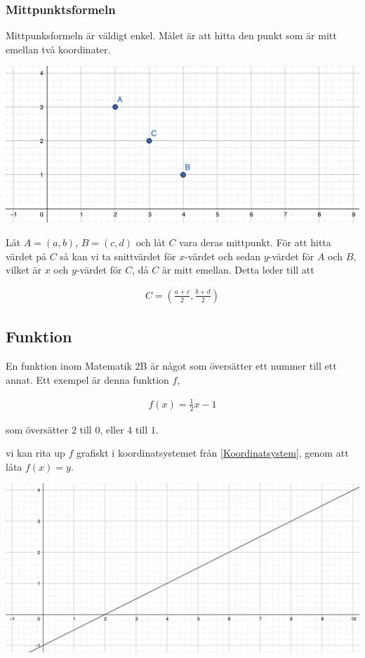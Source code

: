 \newpage
\subsubsection{Mittpunktsformeln}

Mittpunksformeln är väldigt enkel. Målet är att hitta den punkt som är mitt emellan två koordinater.

\includegraphics[width=\textwidth]{img/4.png}

Låt $A=(a,b)$, $B=(c,d)$ och låt $C$ vara deras mittpunkt. För att hitta värdet på $C$ så kan vi ta snittvärdet för $x$-värdet och sedan $y$-värdet för $A$ och $B$, vilket är $x$ och $y$-värdet för $C$, då $C$ är mitt emellan. Detta leder till att

\begin{align}
	C = \left(\frac{a+c}{2}, \frac{b+d}{2}\right)
\end{align}

\newpage
\subsection{Funktion}

En funktion inom Matematik 2B är något som översätter ett nummer till ett annat. Ett exempel är denna funktion $f$,

\begin{align}
	f(x) = \frac{1}{2}x-1
\end{align}

som översätter $2$ till $0$, eller $4$ till $1$.

vi kan rita up $f$ grafiskt i koordinatsystemet från \ref{Koordinatsystem}, genom att låta $f(x) = y$.

\includegraphics[width=\textwidth]{img/2.png}

